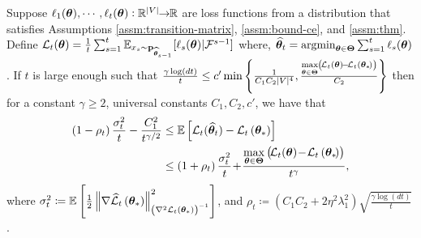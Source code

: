

\begin{customtheorem}{1}
\label{thm:main}
Suppose $\ell_{1}(\bm{\theta}), \cdots, \ell_{t}(\bm{\theta}): \mathbb{R}^{|V|} \!\!\rightarrow \!\!\mathbb{R}$ are loss functions from a distribution that satisfies Assumptions \ref{assm:transition-matrix}, \ref{assm:bound-ce}, and \ref{assm:thm}. Define 
    ${\cal L}_t(\bm{\theta}) = \frac{1}{t}\sum_{s=1}^t\mathbb{E}_{x_s\sim \mathbf{p}_{{\widehat{\bm{\theta}}}_{s-1}}}[\ell_s(\bm{\theta})|\mathcal{F}^{s-1}]$
where, ${\widehat{\bm{\theta}}}_t =\operatorname*{argmin}_{\bm{\theta} \in \bm{\Theta}} \sum_{s = 1}^t \ell_{s}(\bm{\theta})$. If $t$ is large enough such that $ \frac{\gamma\log(dt)}{t}\leq c^{\prime} \min \left\{\frac{1}{C_{1}C_{2} |V|^4 }, \frac{\max\limits_{\bm{\theta} \in \bm{\Theta}}\left(\!{\cal L}_{t}(\bm{\theta})\!-\!{\cal L}_{t}\left(\bm{\theta}_{*}\!\right)\right)}{C_{2}}\right\}$
then for a constant $\gamma \geq 2$,  universal constants $C_1,C_2,c'$,  we have that 
\begin{align*}
\left(1-\rho_{t}\right) \frac{\sigma_t^2}{t}- \frac{C_1^2}{t^{\gamma / 2}} 
&\leq \mathbb{E}\left[{\cal L}_t({\widehat{\bm{\theta}}}_t)-{\cal L}_t\left(\bm{\theta}_{*}\right)\right] \\
&\leq \left(1+\rho_{t}\right) \frac{\sigma_t^2}{t}\!+\!\frac{\max\limits_{\bm{\theta} \in \bm{\Theta}}\left(\!{\cal L}_{t}(\bm{\theta})\!-\!{\cal L}_{t}\left(\bm{\theta}_{*}\!\right)\right)}{t^{\gamma}},
\end{align*}
where 
$\sigma^{2}_t \coloneqq \mathbb{E}_{}\left[\frac{1}{2}\left\|\nabla \widehat{\cal L}_{t}\left(\bm{\theta}_{*}\right)\right\|_{\left(\nabla^{2} {\cal L}_t\left(\bm{\theta}_{*}\right)\right)^{-1}}^{2}\right]$, 
and $\rho_t \coloneqq \left(C_1C_2 + 2\eta^2\lambda_1^2\right)\sqrt{\frac{\gamma\log(dt)}{t}}$.
\end{customtheorem}

